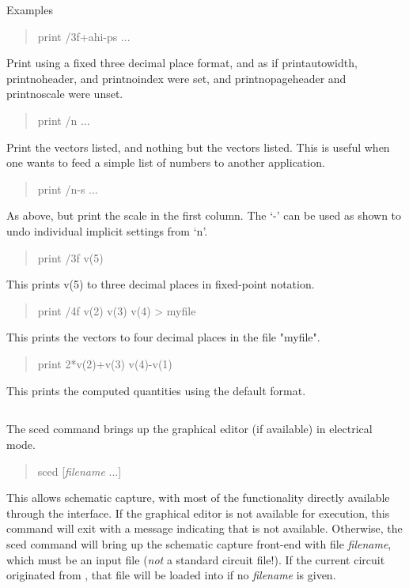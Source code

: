 Examples
\begin{quote}\vt
print /3f+ahi-ps ...
\end{quote}
Print using a fixed three decimal place format, and as if {\et
printautowidth}, {\et printnoheader}, and {\et printnoindex} were set,
and {\et printnopageheader} and {\et printnoscale} were unset.
\begin{quote}\vt
print /n ...
\end{quote}
Print the vectors listed, and nothing but the vectors listed.  This is
useful when one wants to feed a simple list of numbers to another
application.
\begin{quote}\vt
print /n-s ...
\end{quote}
As above, but print the scale in the first column.  The `{\vt -}' can
be used as shown to undo individual implicit settings from `{\vt n}'.
\begin{quote}\vt
print /3f v(5)
\end{quote}
This prints v(5) to three decimal places in fixed-point notation.
\begin{quote}\vt
print /4f v(2) v(3) v(4) > myfile
\end{quote}
This prints the vectors to four decimal places in the file "myfile".
\begin{quote}\vt
print 2*v(2)+v(3) v(4)-v(1)
\end{quote}
This prints the computed quantities using the default format.

\subsection{}


The {\cb sced} command brings up the {\Xic} graphical editor (if
available) in electrical mode.
\begin{quote}\vt
sced [{\it filename} ...]
\end{quote}
This allows schematic capture, with most of the {\WRspice}
functionality directly available through the {\Xic} interface.  If the
{\Xic} graphical editor is not available for execution, this command
will exit with a message indicating that {\Xic} is not available. 
Otherwise, the {\cb sced} command will bring up the schematic capture
front-end with file {\it filename\/}, which must be an {\Xic} input
file ({\it not} a standard {\WRspice} circuit file!).  If the current
circuit originated from {\Xic}, that file will be loaded into {\Xic}
if no {\it filename} is given. 

